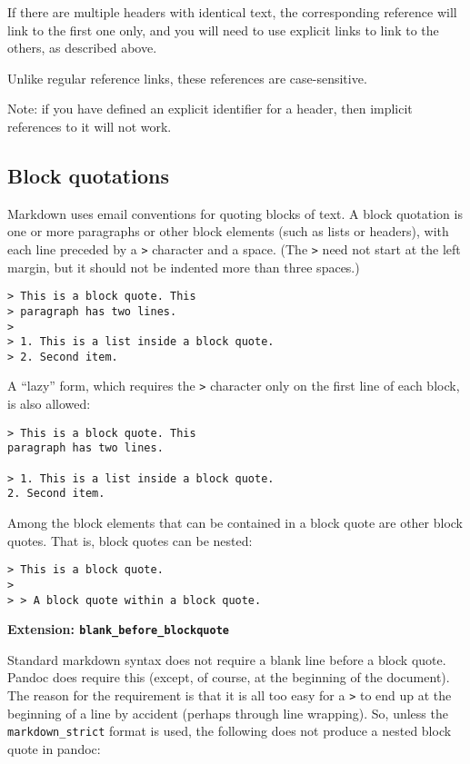 \documentclass[]{article}
\begin{document}
If there are multiple headers with identical text, the corresponding
reference will link to the first one only, and you will need to use
explicit links to link to the others, as described above.

Unlike regular reference links, these references are case-sensitive.

Note: if you have defined an explicit identifier for a header, then
implicit references to it will not work.

\subsection{Block quotations}\label{block-quotations}

Markdown uses email conventions for quoting blocks of text. A block
quotation is one or more paragraphs or other block elements (such as
lists or headers), with each line preceded by a \texttt{\textgreater{}}
character and a space. (The \texttt{\textgreater{}} need not start at
the left margin, but it should not be indented more than three spaces.)

\begin{verbatim}
> This is a block quote. This
> paragraph has two lines.
>
> 1. This is a list inside a block quote.
> 2. Second item.
\end{verbatim}

A ``lazy'' form, which requires the \texttt{\textgreater{}} character
only on the first line of each block, is also allowed:

\begin{verbatim}
> This is a block quote. This
paragraph has two lines.

> 1. This is a list inside a block quote.
2. Second item.
\end{verbatim}

Among the block elements that can be contained in a block quote are
other block quotes. That is, block quotes can be nested:

\begin{verbatim}
> This is a block quote.
>
> > A block quote within a block quote.
\end{verbatim}

\textbf{Extension: \texttt{blank\_before\_blockquote}}

Standard markdown syntax does not require a blank line before a block
quote. Pandoc does require this (except, of course, at the beginning of
the document). The reason for the requirement is that it is all too easy
for a \texttt{\textgreater{}} to end up at the beginning of a line by
accident (perhaps through line wrapping). So, unless the
\texttt{markdown\_strict} format is used, the following does not produce
a nested block quote in pandoc:
\end{document}
